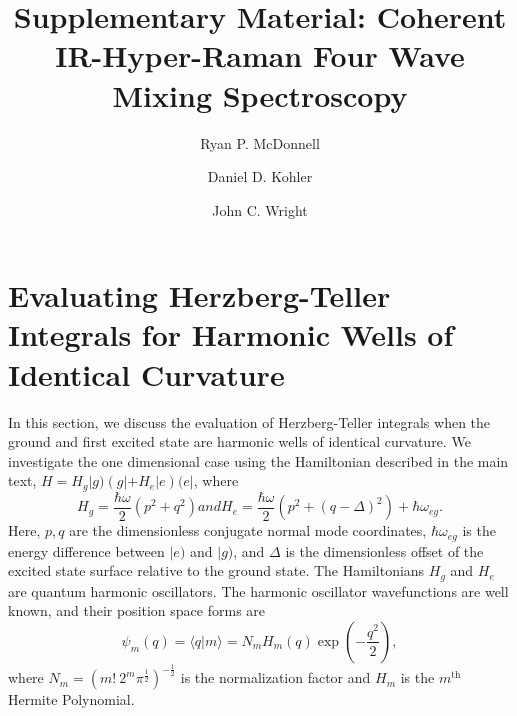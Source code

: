 \documentclass[aip, jcp, reprint, onecolumn, nofootinbib]{revtex4-2}
\begin{document}
\title{Supplementary Material: Coherent IR-Hyper-Raman Four Wave Mixing Spectroscopy}


\author{Ryan P. McDonnell} 
\author{Daniel D. Kohler}
\author{John C. Wright} 



\maketitle
\tableofcontents
\clearpage


\section{Evaluating Herzberg-Teller Integrals for Harmonic Wells of Identical Curvature}

In this section, we discuss the evaluation of Herzberg-Teller integrals when the ground and first excited state are harmonic wells of identical curvature.\cite{HerzbergTeller1933}
We investigate the one dimensional case using the Hamiltonian described in the main text, $H = H_g |g) \left(g| + H_e |e\right) (e|$, where
\begin{subequations}\label{Hamiltonian}
	\begin{equation}
		H_g = \frac{\hbar \omega }{2} \left(p^2 + q^2 \right)
	\end{equation}
	and
	\begin{equation}
		H_e = \frac{\hbar \omega }{2} \left(p^2 +  (q-\Delta)^2 \right) + \hbar \omega_{eg}.
	\end{equation} 
\end{subequations}
Here, $p,q$ are the dimensionless conjugate normal mode coordinates, $\hbar\omega_{eg}$ is the energy difference between $|e)$ and $|g)$, and $\Delta$ is the dimensionless offset of the excited state surface relative to the ground state.
The Hamiltonians $H_g$ and $H_e$ are quantum harmonic oscillators.
The harmonic oscillator wavefunctions are well known, and their position space forms are
\begin{equation}
	\psi_m(q) = \langle q | m \rangle = N_m H_m(q) \exp(-\frac{q^2}{2}),
\end{equation}
where $N_m = (m! \ 2^m \pi^{\frac{1}{2}})^{-\frac{1}{2}}$ is the normalization factor and $H_m$ is the $m^\text{th}$ Hermite Polynomial.\cite{RN230, MorseFeshbach}
\end{document}
